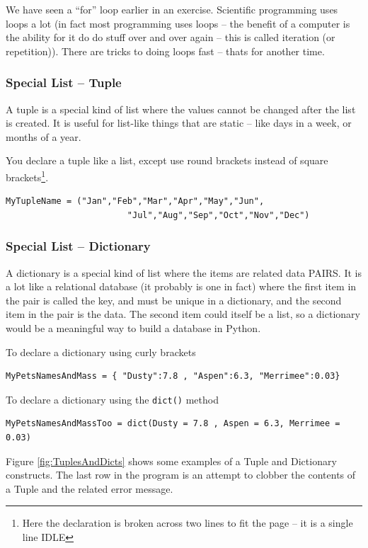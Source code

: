 We have seen a ``for'' loop earlier in an exercise.   Scientific programming uses loops a lot (in fact most programming uses loops -- the benefit of a computer is the ability for it do do stuff over and over again -- this is called iteration (or repetition)).  There are tricks to doing loops fast -- thats for another time.

\subsubsection{Special List -- Tuple}
A tuple is a special kind of list where the values cannot be changed after the list is created.  It is useful for list-like things that are static -- like days in a week, or months of a year.

You declare a tuple like a list, except use round brackets instead of square brackets\footnote{Here the declaration is broken across two lines to fit the page -- it is a single line IDLE}.  
\begin{verbatim}
MyTupleName = ("Jan","Feb","Mar","Apr","May","Jun",
                        "Jul","Aug","Sep","Oct","Nov","Dec")
\end{verbatim}

\subsubsection{Special List -- Dictionary}
A dictionary is a special kind of list where the items are related data PAIRS.  It is a lot like a relational database (it probably is one in fact) where the first item in the pair is called the key, and must be unique in a dictionary, and the second item in the pair is the data.   The second item could itself be a list, so a dictionary would be a meaningful way to build a database in Python.

To declare a dictionary using curly brackets
\begin{verbatim}
MyPetsNamesAndMass = { "Dusty":7.8 , "Aspen":6.3, "Merrimee":0.03}
\end{verbatim}

To declare a dictionary using the \texttt{dict()} method
\begin{verbatim}
MyPetsNamesAndMassToo = dict(Dusty = 7.8 , Aspen = 6.3, Merrimee = 0.03)
\end{verbatim}

Figure \ref{fig:TuplesAndDicts} shows some examples of a Tuple and Dictionary constructs.   The last row in the program is an attempt to clobber the contents of a Tuple and the related error message.

